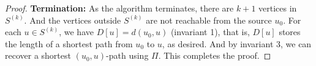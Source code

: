 \documentclass[thmcnt=section, 12pt, color=cyan]{my-elegantbook}
\begin{document}
\begin{proof}
    \noindent\textbf{Termination:} As the algorithm terminates, there are $k+1$ vertices in $S^{(k)}$. And the vertices outside $S^{(k)}$ are not reachable from the source $u_0$. For each $u \in S^{(k)}$, we have $D[u] = d(u_0, u)$ (invariant 1), that is, $D[u]$ stores the length of a shortest path from $u_0$ to $u$, as desired. And by invariant 3, we can recover a shortest $(u_0, u)$-path using $\Pi$. This completes the proof.
\end{proof}



\printbibliography[heading=bibintoc, title=References]


\printindex

\end{document}
